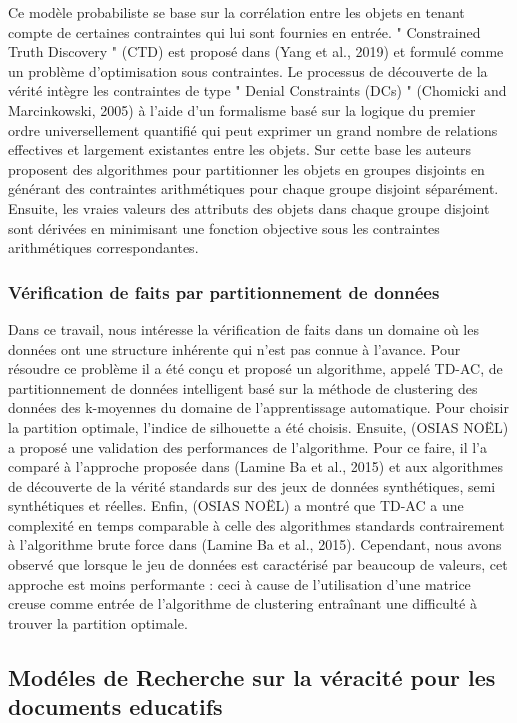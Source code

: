 \documentclass[12pt]{report}
\begin{document}
Ce modèle probabiliste se base sur la corrélation entre les objets en tenant
compte de certaines contraintes qui lui sont fournies en entrée. "
Constrained Truth Discovery " (CTD) est proposé dans (Yang et al., 2019)
et formulé comme un problème d’optimisation sous contraintes. Le
processus de découverte de la vérité intègre les contraintes de type "
Denial Constraints (DCs) " (Chomicki and Marcinkowski, 2005) à l’aide
d’un formalisme basé sur la logique du premier ordre universellement
quantifié qui peut exprimer un grand nombre de relations effectives et
largement existantes entre les objets. Sur cette base les auteurs proposent
des algorithmes pour partitionner les objets en groupes disjoints en
générant des contraintes arithmétiques pour chaque groupe disjoint
séparément. Ensuite, les vraies valeurs des attributs des objets dans chaque
groupe disjoint sont dérivées en minimisant une fonction objective sous les
contraintes arithmétiques correspondantes\cite{55}.
\subsubsection{Vérification de faits par partitionnement de données}

Dans ce travail, nous intéresse la vérification de faits dans un domaine où
les données ont une structure inhérente qui n’est pas connue à l’avance.
Pour résoudre ce problème il a été conçu et proposé un algorithme, appelé
TD-AC, de partitionnement de données intelligent basé sur la méthode de
clustering des données des k-moyennes du domaine de l’apprentissage
automatique. Pour choisir la partition optimale, l’indice de silhouette a été
choisis. Ensuite, (OSIAS NOËL) a proposé une validation des
performances de l’algorithme. Pour ce faire, il l’a comparé à l’approche
proposée dans (Lamine Ba et al., 2015) et aux algorithmes de découverte
de la vérité standards sur des jeux de données synthétiques, semi
synthétiques et réelles. Enfin, (OSIAS NOËL) a montré que TD-AC a une
complexité en temps comparable à celle des algorithmes standards
contrairement à l’algorithme brute force dans (Lamine Ba et al., 2015).
Cependant, nous avons observé que lorsque le jeu de données est
caractérisé par beaucoup de valeurs, cet approche est moins
performante : ceci à cause de l’utilisation d’une matrice creuse comme
entrée de l’algorithme de clustering entraînant une difficulté à trouver la
partition optimale\cite{56}.
\subsection{Modéles de Recherche sur la véracité pour les documents educatifs}
\end{document}
